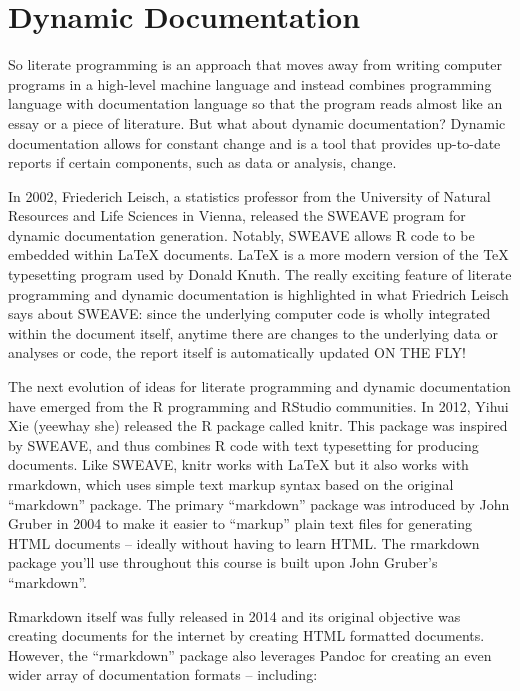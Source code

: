 \documentclass[]{book}
\theoremstyle{definition}
\theoremstyle{definition}
\theoremstyle{definition}
\theoremstyle{remark}
\begin{document}
\section{Dynamic Documentation}\label{dynamic-documentation}

So literate programming is an approach that moves away from writing
computer programs in a high-level machine language and instead combines
programming language with documentation language so that the program
reads almost like an essay or a piece of literature. But what about
dynamic documentation? Dynamic documentation allows for constant change
and is a tool that provides up-to-date reports if certain components,
such as data or analysis, change.

In 2002, Friederich Leisch, a statistics professor from the University
of Natural Resources and Life Sciences in Vienna, released the SWEAVE
program for dynamic documentation generation. Notably, SWEAVE allows R
code to be embedded within LaTeX documents. LaTeX is a more modern
version of the TeX typesetting program used by Donald Knuth. The really
exciting feature of literate programming and dynamic documentation is
highlighted in what Friedrich Leisch says about SWEAVE: since the
underlying computer code is wholly integrated within the document
itself, anytime there are changes to the underlying data or analyses or
code, the report itself is automatically updated ON THE FLY!

The next evolution of ideas for literate programming and dynamic
documentation have emerged from the R programming and RStudio
communities. In 2012, Yihui Xie (yeewhay she) released the R package
called knitr. This package was inspired by SWEAVE, and thus combines R
code with text typesetting for producing documents. Like SWEAVE, knitr
works with LaTeX but it also works with rmarkdown, which uses simple
text markup syntax based on the original ``markdown'' package. The
primary ``markdown'' package was introduced by John Gruber in 2004 to
make it easier to ``markup'' plain text files for generating HTML
documents -- ideally without having to learn HTML. The rmarkdown package
you'll use throughout this course is built upon John Gruber's
``markdown''.

Rmarkdown itself was fully released in 2014 and its original objective
was creating documents for the internet by creating HTML formatted
documents. However, the ``rmarkdown'' package also leverages Pandoc for
creating an even wider array of documentation formats -- including:
\end{document}
